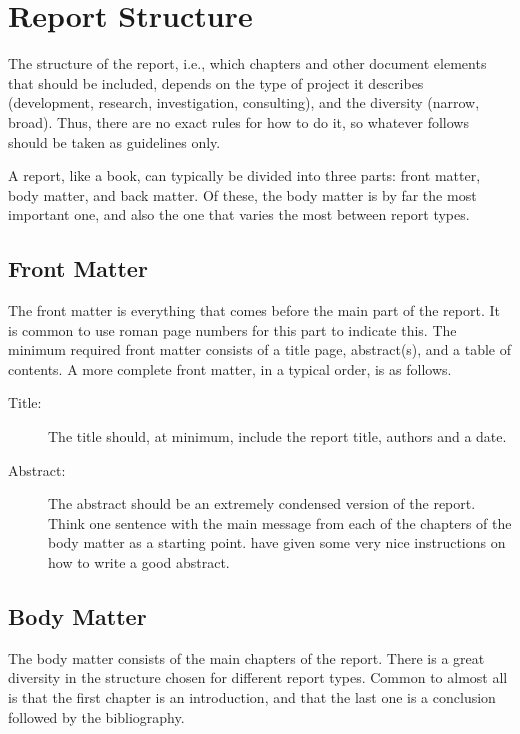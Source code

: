 \section{Report Structure}

The structure of the report, i.e., which chapters and other document elements that should be included, depends on the type of project it describes (development, research, investigation, consulting), and the diversity (narrow, broad). Thus, there are no exact rules for how to do it, so whatever follows should be taken as guidelines only.

A report, like a book, can typically be divided into three parts: front matter, body matter, and back matter. Of these, the body matter is by far the most important one, and also the one that varies the most between report types.

\subsection{Front Matter}
\label{sec:frontmatter}

The front matter is everything that comes before the main part of the report. It is common to use roman page numbers for this part to indicate this. The minimum required front matter consists of a title page, abstract(s), and a table of contents. A more complete front matter, in a typical order, is as follows.

\begin{description}
    \item[Title:] The title should, at minimum, include the report title, authors and a date.
    \item[Abstract:] The abstract should be an extremely condensed version of the report. Think one sentence with the main message from each of the chapters of the body matter as a starting point. \textcite{landes1951scrutiny} have given some very nice instructions on how to write a good abstract.
\end{description}

\subsection{Body Matter}

The body matter consists of the main chapters of the report. There is a great diversity in the structure chosen for different report types. Common to almost all is that the first chapter is an introduction, and that the last one is a conclusion followed by the bibliography.

